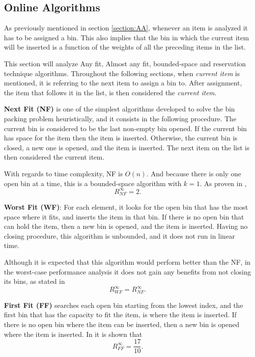 \subsection{Online Algorithms}

As previously mentioned in section \ref{section:AA}, whenever an item is
analyzed it has to be assigned a bin. This also implies that the bin in which
the current item will be inserted is a function of the weights of all the
preceding items in the list.

This section will analyze Any fit, Almost any fit, bounded-space and reservation
technique algorithms.  Throughout the following sections, when \textit{current
item} is mentioned, it is referring to the next item to assign a bin to. After
assignment, the item that follows it in the list, is then considered the
\textit{current item}.

\textbf{Next Fit (NF)} is one of the simplest algorithms developed to solve the
bin packing problem heuristically, and it consists in the following procedure.
The current bin is considered to be the last non-empty bin opened. If the
current bin has space for the item then the item is inserted. Otherwise, the
current bin is closed, a new one is opened, and the item is inserted. The next
item on the list is then considered the current item.

With regards to time complexity, NF is $O(n)$. And because there is only one
open bin at a time, this is a bounded-space algorithm with $k = 1$. As proven in
\cite{johnson1973near}, 
\begin{equation}
    R_{NF}^\infty = 2.
\end{equation}

\textbf{Worst Fit (WF)}: For each element, it looks for the open bin that has
the most space where it fits, and inserts the item in that bin. If there is no
open bin that can hold the item, then a new bin is opened, and the item is
inserted. Having no closing procedure, this algorithm is unbounded, and it does
not run in linear time.

Although it is expected that this algorithm would perform better than the NF, in
the worst-case performance analysis it does not gain any benefits from not
closing its bins, as stated in \cite{man1996approximation}
\begin{equation}
    R_{WF}^\infty = R_{NF}^\infty.
\end{equation}

\textbf{First Fit (FF)} searches each open bin starting from the lowest index,
and the first bin that has the capacity to fit the item, is where the item is
inserted. If there is no open bin where the item can be inserted, then a new bin
is opened where the item is inserted. In \cite{johnson1974worst} it is shown
that
\begin{equation}
    R_{FF}^\infty = \frac{17}{10}.
\end{equation}

